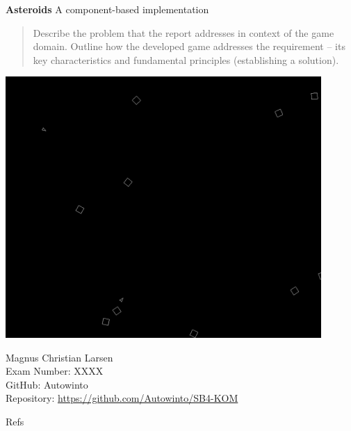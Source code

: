 \documentclass{article}
\begin{document}
\begin{titlepage}
    \begin{center}
        \vspace*{1cm}
        \Huge
        \textbf{Asteroids}
        \vspace{0.5cm}
        \LARGE
        A component-based implementation
        \begin{abstract}
            Describe the problem that the report addresses in context of the 
            game domain.
            Outline how the developed game addresses the requirement – its key 
            characteristics and fundamental principles 
            (establishing a solution).

        \end{abstract}
        \includegraphics[width=12cm]{images/Asteroids}
    \end{center}

    \begin{center}
        Magnus Christian Larsen\\
        Exam Number: XXXX\\
        GitHub: Autowinto\\
        Repository: \url{https://github.com/Autowinto/SB4-KOM}\\
    \end{center}
\end{titlepage}

\tableofcontents












Refs
\end{document}
